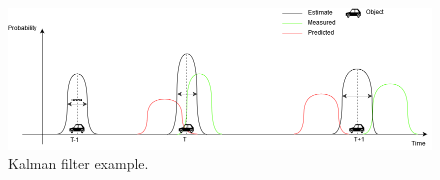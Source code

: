 \begin{figure}[H]
	\centering
	\includegraphics[width=0.7\linewidth]{positioning/positioning/DiagramKalman}
	\caption{Kalman filter example.}
	\label{fig:Kalmanfilter}
\end{figure}